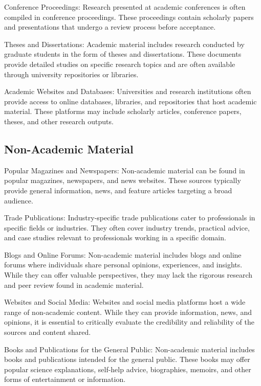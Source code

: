 \begin{spacing}{2.0}
Conference Proceedings: Research presented at academic conferences is often compiled in conference proceedings. These proceedings contain scholarly papers and presentations that undergo a review process before acceptance.

Theses and Dissertations: Academic material includes research conducted by graduate students in the form of theses and dissertations. These documents provide detailed studies on specific research topics and are often available through university repositories or libraries.

Academic Websites and Databases: Universities and research institutions often provide access to online databases, libraries, and repositories that host academic material. These platforms may include scholarly articles, conference papers, theses, and other research outputs.

\subsection{Non-Academic Material}

Popular Magazines and Newspapers: Non-academic material can be found in popular magazines, newspapers, and news websites. These sources typically provide general information, news, and feature articles targeting a broad audience.

Trade Publications: Industry-specific trade publications cater to professionals in specific fields or industries. They often cover industry trends, practical advice, and case studies relevant to professionals working in a specific domain.

Blogs and Online Forums: Non-academic material includes blogs and online forums where individuals share personal opinions, experiences, and insights. While they can offer valuable perspectives, they may lack the rigorous research and peer review found in academic material.

Websites and Social Media: Websites and social media platforms host a wide range of non-academic content. While they can provide information, news, and opinions, it is essential to critically evaluate the credibility and reliability of the sources and content shared.

Books and Publications for the General Public: Non-academic material includes books and publications intended for the general public. These books may offer popular science explanations, self-help advice, biographies, memoirs, and other forms of entertainment or information.


\end{spacing}
